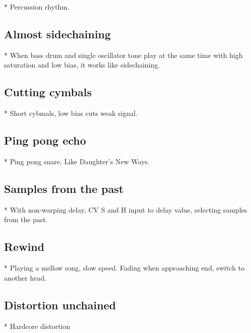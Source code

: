 \documentclass[11pt]{article}
\begin{document}
* Percussion rhythm.

\subsection{Almost sidechaining}

* When bass drum and single oscillator tone play at the same time with high
  saturation and low bias, it works like sidechaining.

\subsection{Cutting cymbals}

* Short cybmals, low bias cuts weak signal.

\subsection{Ping pong echo}

* Ping pong snare. Like Daughter's New Ways.

\subsection{Samples from the past}

* With non-warping delay, CV S and H input to delay value, selecting samples from
  the past.

\subsection{Rewind}

* Playing a mellow song, slow speed. Fading when approaching end, switch to another head.

\subsection{Distortion unchained}

* Hardcore distortion

\newpage
\end{document}

